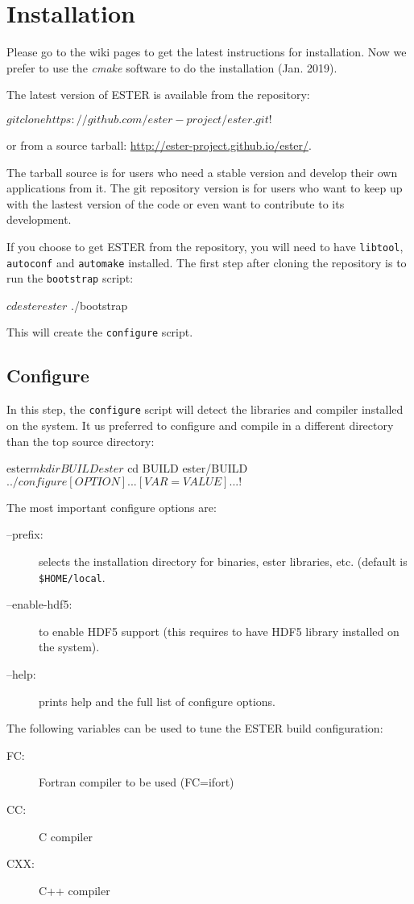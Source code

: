 \pagebreak

\section{Installation}

Please go to the wiki pages to get the latest instructions for installation.
Now we prefer to use the {\em cmake} software to do the installation (Jan. 2019).

The latest version of ESTER is available from the \git repository:
\begin{shell}
    $ git clone https://github.com/ester-project/ester.git
    !$
\end{shell}
or from a source tarball: \url{http://ester-project.github.io/ester/}.

The tarball source is for users who need a stable version and develop
their own applications from it. The git repository version is for users
who want to keep up with the lastest version of the code or even want to
contribute to its development.

If you choose to get ESTER from the \git repository, you will need to have
\texttt{libtool}, \texttt{autoconf} and \texttt{automake} installed.
The first step after cloning the repository is to run the \texttt{bootstrap}
script:
\begin{shell}
    $ cd ester
    ester$ ./bootstrap
\end{shell}
This will create the \texttt{configure} script.

\subsection{Configure}
In this step, the \texttt{configure} script will detect the libraries and
compiler installed on the system.
It us preferred to configure and compile in a different directory than the top
source directory:
\begin{shell}
    ester$ mkdir BUILD
    ester$ cd BUILD
    ester/BUILD$ ../configure [OPTION]... [VAR=VALUE]...
    !$
\end{shell}

The most important configure options are:
\begin{description}
    \item[--prefix:] selects the installation directory for binaries,
ester libraries, etc. (default is \texttt{\$HOME/local}.
    \item[--enable-hdf5:] to enable HDF5 support (this requires to have HDF5
        library installed on the system).
    \item[--help:] prints help and the full list of configure options.
\end{description}
The following variables can be used to tune the ESTER build configuration:
\begin{description}
    \item[FC:] Fortran compiler to be used (\eg FC=ifort)
    \item[CC:] C compiler
    \item[CXX:] C++ compiler
\end{description}


